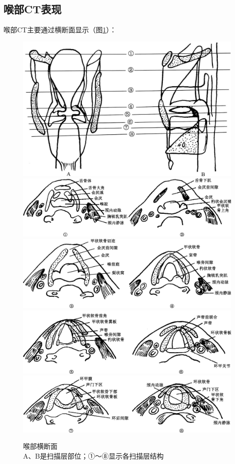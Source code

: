 \subsection{喉部CT表现}

喉部CT主要通过横断面显示（图\ref{fig6-4}）：



\begin{figure}[!htbp]
 \centering
\includegraphics[width=.7\textwidth,height=\textheight,keepaspectratio]{./images/Image00137.jpg}
\includegraphics[width=.7\textwidth,height=\textheight,keepaspectratio]{./images/Image00138.jpg}
\includegraphics[width=.7\textwidth,height=\textheight,keepaspectratio]{./images/Image00139.jpg}
\includegraphics[width=.7\textwidth,height=\textheight,keepaspectratio]{./images/Image00140.jpg}
\includegraphics[width=.7\textwidth,height=\textheight,keepaspectratio]{./images/Image00141.jpg}
 \captionsetup{justification=centering}
 \caption{喉部横断面\\{\small A、B是扫描层部位；①～⑧显示各扫描层结构}}
 \label{fig6-4}
  \end{figure} 

